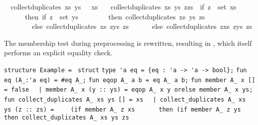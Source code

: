 \begin{isabellebody}
\ \ {\isachardoublequoteopen}collect{\isacharunderscore}duplicates\ xs\ ys\ {\isacharbrackleft}{\isacharbrackright}\ {\isacharequal}\ xs{\isachardoublequoteclose}\isanewline
\ \ {\isacharbar}\ {\isachardoublequoteopen}collect{\isacharunderscore}duplicates\ xs\ ys\ {\isacharparenleft}z{\isacharhash}zs{\isacharparenright}\ {\isacharequal}\ {\isacharparenleft}if\ z\ {\isasymin}\ set\ xs\isanewline
\ \ \ \ \ \ then\ if\ z\ {\isasymin}\ set\ ys\isanewline
\ \ \ \ \ \ \ \ then\ collect{\isacharunderscore}duplicates\ xs\ ys\ zs\isanewline
\ \ \ \ \ \ \ \ else\ collect{\isacharunderscore}duplicates\ xs\ {\isacharparenleft}z{\isacharhash}ys{\isacharparenright}\ zs\isanewline
\ \ \ \ \ \ else\ collect{\isacharunderscore}duplicates\ {\isacharparenleft}z{\isacharhash}xs{\isacharparenright}\ {\isacharparenleft}z{\isacharhash}ys{\isacharparenright}\ zs{\isacharparenright}{\isachardoublequoteclose}%
\endisatagquote
{\isafoldquote}%
%
\isadelimquote
%
\endisadelimquote
%
\begin{isamarkuptext}%
\noindent The membership test during preprocessing is rewritten,
  resulting in , which itself
  performs an explicit equality check.%
\end{isamarkuptext}%
\isamarkuptrue%
%
\isadelimquote
%
\endisadelimquote
%
\isatagquote
%
\begin{isamarkuptext}%
\isaverbatim%
\noindent%
\verb|structure Example = |\newline%
\verb|struct|\newline%
\newline%
\verb|type 'a eq = {eq : 'a -> 'a -> bool};|\newline%
\verb|fun eq (A_:'a eq) = #eq A_;|\newline%
\newline%
\verb|fun eqop A_ a b = eq A_ a b;|\newline%
\newline%
\verb|fun member A_ x [] = false|\newline%
\verb|  |\verb,|,\verb| member A_ x (y :: ys) = eqop A_ x y orelse member A_ x ys;|\newline%
\newline%
\verb|fun collect_duplicates A_ xs ys [] = xs|\newline%
\verb|  |\verb,|,\verb| collect_duplicates A_ xs ys (z :: zs) =|\newline%
\verb|    (if member A_ z xs|\newline%
\verb|      then (if member A_ z ys then collect_duplicates A_ xs ys zs|\newline%

\end{isamarkuptext}
\end{isabellebody}
